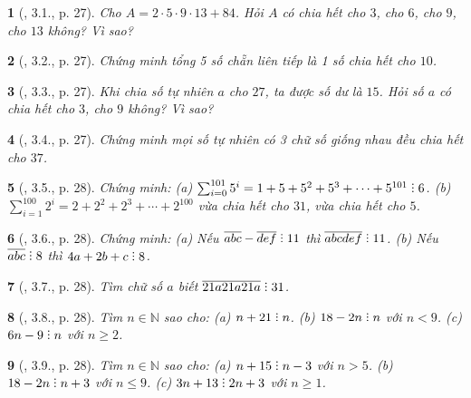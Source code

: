 \documentclass{article}
\newtheorem{baitoan}{}
\DeclareRobustCommand{\divby}{%
	\mathrel{\vbox{\baselineskip.65ex\lineskiplimit0pt\hbox{.}\hbox{.}\hbox{.}}}%
}
\begin{document}
\begin{baitoan}[\cite{Binh_boi_duong_Toan_6_tap_1}, 3.1., p. 27]
	Cho $A = 2\cdot5\cdot9\cdot13 + 84$. Hỏi $A$ có chia hết cho $3$, cho $6$, cho $9$, cho $13$ không? Vì sao?
\end{baitoan}

\begin{baitoan}[\cite{Binh_boi_duong_Toan_6_tap_1}, 3.2., p. 27]
	Chứng minh tổng 5 số chẵn liên tiếp là 1 số chia hết cho $10$.
\end{baitoan}

\begin{baitoan}[\cite{Binh_boi_duong_Toan_6_tap_1}, 3.3., p. 27]
	Khi chia số tự nhiên $a$ cho $27$, ta được số dư là $15$. Hỏi số $a$ có chia hết cho $3$, cho $9$ không? Vì sao?
\end{baitoan}

\begin{baitoan}[\cite{Binh_boi_duong_Toan_6_tap_1}, 3.4., p. 27]
	Chứng minh mọi số tự nhiên có 3 chữ số giống nhau đều chia hết cho $37$.
\end{baitoan}

\begin{baitoan}[\cite{Binh_boi_duong_Toan_6_tap_1}, 3.5., p. 28]
	Chứng minh: (a) $\sum_{i=0}^{101} 5^i = 1 + 5 + 5^2 + 5^3 + \cdots + 5^{101}\divby6$. (b) $\sum_{i=1}^{100} 2^i = 2 + 2^2 + 2^3 + \cdots + 2^{100}$ vừa chia hết cho $31$, vừa chia hết cho $5$.
\end{baitoan}

\begin{baitoan}[\cite{Binh_boi_duong_Toan_6_tap_1}, 3.6., p. 28]
	Chứng minh: (a) Nếu $\overline{abc} - \overline{def}\divby11$ thì $\overline{abcdef}\divby11$. (b) Nếu $\overline{abc}\divby8$ thì $4a + 2b + c\divby8$.
\end{baitoan}

\begin{baitoan}[\cite{Binh_boi_duong_Toan_6_tap_1}, 3.7., p. 28]
	Tìm chữ số $a$ biết $\overline{21a21a21a}\divby31$.
\end{baitoan}

\begin{baitoan}[\cite{Binh_boi_duong_Toan_6_tap_1}, 3.8., p. 28]
	Tìm $n\in\mathbb{N}$ sao cho: (a) $n + 21\divby n$. (b) $18 - 2n\divby n$ với $n < 9$. (c) $6n - 9\divby n$ với $n\ge2$.
\end{baitoan}

\begin{baitoan}[\cite{Binh_boi_duong_Toan_6_tap_1}, 3.9., p. 28]
	Tìm $n\in\mathbb{N}$ sao cho: (a) $n + 15\divby n - 3$ với $n > 5$. (b) $18 - 2n\divby n + 3$ với $n\le9$. (c) $3n + 13\divby2n + 3$ với $n\ge1$.
\end{baitoan}
\end{document}
